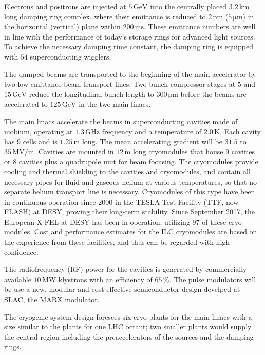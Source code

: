 \documentclass[%
 reprint,
 amsmath,amssymb,
 aps,
]{revtex4-1}
\begin{document}
Electrons and positrons are injected at $5\,{\mathrm{GeV}}$ into the centrally placed $3.2\,{\mathrm{km}}$ long damping ring complex, where their emittance is reduced to $2\,{\mathrm{pm}}$ ($5\,{\mathrm{\mu m}}$) in the horizontal (vertical) plane within $200\,{\mathrm{ms}}$. 
These emittance numbers are well in line with the performance of today's storage rings for advanced light sources.
To achieve the necessary damping time constant, the damping ring is equipped with $54$ superconducting wigglers. 

The damped beams are transported to the beginning of the main accelerator by two low emittance beam transport lines. Two bunch compressor stages at $5$ and $15\,{\mathrm{GeV}}$ reduce the longitudinal bunch length to $300\,{\mathrm{\mu m}}$ before the beams are accelerated to $125\,{\mathrm{GeV}}$ in the two main linacs.

The main linacs accelerate the beams in superconducting cavities made of niobium, operating at $1.3\,{\mathrm{GHz}}$ frequency and a temperature of $2.0\,{\mathrm{K}}$. 
Each cavity has $9$ cells and is $1.25\,{\mathrm{m}}$ long. The mean accelerating gradient will be $31.5$ to $35\,{\mathrm{MV/m}}$.
Cavities are mounted in $12\,{\mathrm{m}}$ long cryomodules that house $9$ cavities or $8$ cavities plus a quadrupole unit for beam focusing. 
The cryomodules provide cooling and thermal shielding to the cavities and cryomodules, and contain all necessary pipes for fluid and gaseous helium at various temperatures, so that no separate helium transport line is necessary.
Cryomodules of this type have been in continuous operation since 2000 in the TESLA Test Facility (TTF, now FLASH) at DESY,  proving their long-term stability. 
Since September 2017, the European X-FEL at DESY has been in operation, utilizing 97 of these cryo modules. 
Cost and performance estimates for the ILC cryomodules are based on the experience from these facilities, and thus can be regarded with high confidence. 

The radiofrequency (RF) power for the cavities is generated by commercially available $10\,{\mathrm{MW}}$ klystrons with an efficiency of $65\,\%$. 
The pulse modulators will be use a new, modular and cost-effective semiconductor design develped at SLAC, the MARX modulator.

The cryogenic system design foresees six cryo plants for the main linacs with a size similar to the plants for one LHC octant; 
two smaller plants would supply the central region including the preaccelerators of the sources and the damping rings. 
\end{document}
